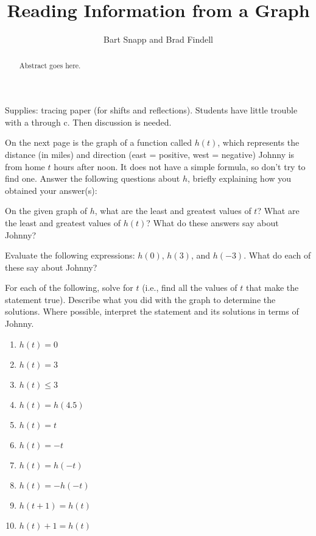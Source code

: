 \documentclass{ximera}
\title{Reading Information from a Graph}
\author{Bart Snapp and Brad Findell}
\begin{document}
\begin{abstract}
Abstract goes here.  
\end{abstract}
\maketitle


\begin{teachingnote}
Supplies:  tracing paper (for shifts and reflections).  
Students have little trouble with a through c.  Then discussion is needed. 
\end{teachingnote}

On the next page is the graph of a function called $h(t)$, which
represents the distance (in miles) and direction (east = positive,
west = negative) Johnny is from home $t$ hours after noon. It does not
have a simple formula, so don't try to find one. Answer the following
questions about $h$, briefly explaining how you obtained your
answer(s):

\begin{problem}
On the given graph of $h$, what are the least and greatest values
of $t$? What are the least and greatest values of $h(t)$? What do
these answers say about Johnny?
\end{problem}

\begin{problem}
Evaluate the following expressions: $h(0)$, $h(3)$, and $h(-3)$. What
do each of these say about Johnny? 
\end{problem}

\begin{problem}
For each of the following, solve for $t$ (i.e., find all the values of
$t$ that make the statement true). Describe what you did with the
graph to determine the solutions.  Where possible, interpret
the statement and its solutions in terms of Johnny.

\begin{enumerate}
\item $h(t) = 0$
\item $h(t) = 3$
\item $h(t) \leq 3$
\item $h(t) = h(4.5)$
\item $h(t) = t$
\item $h(t) = -t$
\item $h(t) = h(-t)$
\item $h(t) = -h(-t)$
\item $h(t+1) = h(t)$
\item $h(t)+1 = h(t)$
\end{enumerate}
\end{problem}

\newpage


\end{document}
